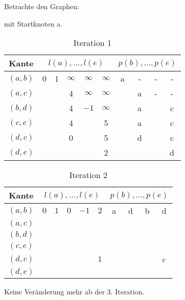 \begin{example}
Betrachte den Graphen:
\begin{center}
\end{center}
mit Startknoten a.
\clearpage
\begin{table}[htpb]
	\centering
	\caption{Iteration 1}
	\label{tab:bmf-1}
	\begin{tabular}{c| c c c c c|c c c c}
		Kante & \multicolumn{5}{c|}{$l(a) , \ldots, l(e)$} & \multicolumn{4}{|c}{$p(b),\ldots,p(e)$} \\ 
		\hline
		$(a,b)$ & 0 & 1 & $\infty$ & $\infty$ & $\infty$  & a & - & - & - \\
		$(a,c)$ & & & 4 & $\infty$ & $\infty$  & & a & - & - \\
		$(b,d)$ & & & 4 & $-1$ & $\infty$ & & a & & c \\ 
		$(c,e)$ & & & 4 & &5 & & a & &c \\
		$(d,c)$ & & & 0 & & 5 & & d & &c \\
		$(d,e)$ & & & & & 2 & & & & d

		 
	\end{tabular}
\end{table}
\begin{table}[htpb]
	\centering
	\caption{Iteration 2}
	\label{tab:bmf-2}
	\begin{tabular}{c| c c c c c|c c c c}
		Kante & \multicolumn{5}{c|}{$l(a),\ldots,l(e)$} & \multicolumn{4}{|c}{$p(b),\ldots, p(e)$}\\
		\hline
		$(a,b)$ & $0$ & $1$ & $0$ & $-1$ & $2$ & a & d & b & d \\
		$(a,c)$\\
		$(b,d)$ \\
		$(c,e)$ \\
		$(d,c)$ & & & & & $1$ & & & & c \\
		$(d,e)$ 


	\end{tabular}
\end{table}
Keine Veränderung mehr ab der 3. Iteration.
\end{example}

